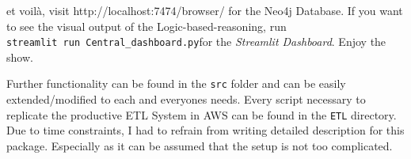 \documentclass[
]{article}
\begin{document}
et voilà, visit http://localhost:7474/browser/ for the Neo4j Database.
If you want to see the visual output of the Logic-based-reasoning, run
\texttt{streamlit\ run\ Central\_dashboard.py}for the \emph{Streamlit
Dashboard}. Enjoy the show.

Further functionality can be found in the \texttt{src} folder and can be
easily extended/modified to each and everyones needs. Every script
necessary to replicate the productive ETL System in AWS can be found in
the \texttt{ETL} directory. Due to time constraints, I had to refrain
from writing detailed description for this package. Especially as it can
be assumed that the setup is not too complicated.
\end{document}
